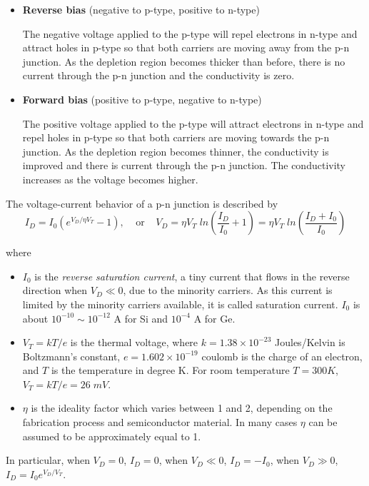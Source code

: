 
\begin{itemize}
\item {\bf Reverse bias} (negative to p-type, positive to n-type)

  The negative voltage applied to the p-type will repel electrons in n-type
  and attract holes in p-type so that both carriers are moving away from 
  the p-n junction. As the depletion region becomes thicker than before, 
  there is no current through the p-n junction and the conductivity is zero.

\item {\bf Forward bias} (positive to p-type, negative to n-type)

  The positive voltage applied to the p-type will attract electrons in n-type
  and repel holes in p-type so that both carriers are moving towards the p-n
  junction. As the depletion region becomes thinner, the conductivity is 
  improved and there is current through the p-n junction. The conductivity
  increases as the voltage becomes higher.
  
\end{itemize}
The voltage-current behavior of a p-n junction is described by
\[ I_D=I_0 ( e^{V_D/\eta V_T}-1 ), \;\;\;\;\mbox{or}\;\;\;\;
	V_D=\eta V_T\;ln (\frac{I_D}{I_0}+1)=\eta V_T\;ln (\frac{I_D+I_0}{I_0})	\]

where 
\begin{itemize}
\item $I_0$ is the {\em reverse saturation current}, a tiny current that 
  flows in the reverse direction when $V_D \ll 0$, due to the minority 
  carriers. As this current is limited by the minority carriers available,
  it is called saturation current. $I_0$ is about $10^{-10} \sim 10^{-12}$ 
  A for Si and $10^{-4}$ A for Ge.
\item $ V_T=kT/e $ is the thermal voltage, where 
  $k=1.38\times 10^{-23}$ Joules/Kelvin is Boltzmann's constant, 
  $e=1.602\times 10^{-19}$ coulomb is the charge of an electron, and
  $T$ is the temperature in degree K. For room temperature $T=300K$, 
  $V_T=kT/e=26\; mV$.
\item $\eta$ is the ideality factor which varies between 1 and 2, depending
  on the fabrication process and semiconductor material. In many cases $\eta$
  can be assumed to be approximately equal to 1.
\end{itemize}
In particular, when $V_D=0$, $I_D=0$, when $V_D\ll 0$, $I_D=-I_0$, when
$V_D\gg 0$, $I_D=I_0 e^{V_D/V_T}$.

